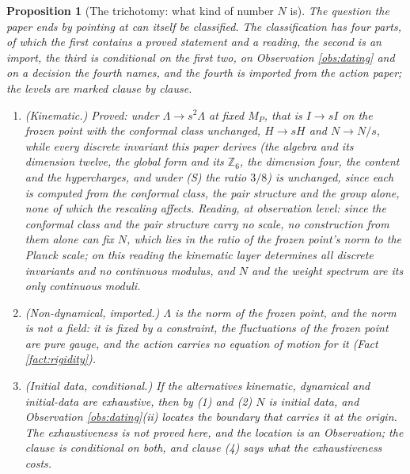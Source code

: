 \documentclass[11pt]{article}
\newtheorem{proposition}[theorem]{Proposition}
\theoremstyle{definition}
\begin{document}
\begin{proposition}[The trichotomy: what kind of number $N$ is]\label{prop:trichotomy}
The question the paper ends by pointing at can itself be classified. The classification has four parts, of which the first contains a proved statement and a reading, the second is an import, the third is conditional on the first two, on Observation \ref{obs:dating} and on a decision the fourth names, and the fourth is imported from the action paper; the levels are marked clause by clause.
\begin{enumerate}
\item \emph{(Kinematic.)} Proved: under $\Lambda \to s^{2}\Lambda$ at fixed $M_{P}$, that is $I \to sI$ on the frozen point with the conformal class unchanged, $H \to sH$ and $N \to N/s$, while every discrete invariant this paper derives (the algebra and its dimension twelve, the global form and its $\mathbb{Z}_{6}$, the dimension four, the content and the hypercharges, and under (S) the ratio $3/8$) is unchanged, since each is computed from the conformal class, the pair structure and the group alone, none of which the rescaling affects. Reading, at observation level: since the conformal class and the pair structure carry no scale, no construction from them alone can fix $N$, which lies in the ratio of the frozen point's norm to the Planck scale; on this reading the kinematic layer determines all discrete invariants and no continuous modulus, and $N$ and the weight spectrum are its only continuous moduli.
\item \emph{(Non-dynamical, imported.)} $\Lambda$ is the norm of the frozen point, and the norm is not a field: it is fixed by a constraint, the fluctuations of the frozen point are pure gauge, and the action carries no equation of motion for it (Fact \ref{fact:rigidity}).
\item \emph{(Initial data, conditional.)} If the alternatives kinematic, dynamical and initial-data are exhaustive, then by (1) and (2) $N$ is initial data, and Observation \ref{obs:dating}(ii) locates the boundary that carries it at the origin. The exhaustiveness is not proved here, and the location is an Observation; the clause is conditional on both, and clause (4) says what the exhaustiveness costs.

\end{enumerate}
\end{proposition}
\end{document}
